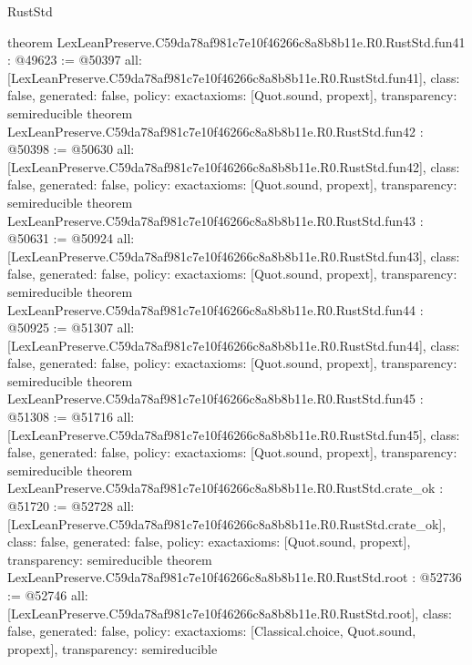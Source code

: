 \begin{lexlean}{RustStd}
\begin{coremodule}
{}
theorem LexLeanPreserve.C59da78af981c7e10f46266c8a8b8b11e.R0.RustStd.fun41 : @49623 := @50397 {
  all: [LexLeanPreserve.C59da78af981c7e10f46266c8a8b8b11e.R0.RustStd.fun41],
  class: false,
  generated: false,
  policy: exact{axioms: [Quot.sound, propext]},
  transparency: semireducible
}
theorem LexLeanPreserve.C59da78af981c7e10f46266c8a8b8b11e.R0.RustStd.fun42 : @50398 := @50630 {
  all: [LexLeanPreserve.C59da78af981c7e10f46266c8a8b8b11e.R0.RustStd.fun42],
  class: false,
  generated: false,
  policy: exact{axioms: [Quot.sound, propext]},
  transparency: semireducible
}
theorem LexLeanPreserve.C59da78af981c7e10f46266c8a8b8b11e.R0.RustStd.fun43 : @50631 := @50924 {
  all: [LexLeanPreserve.C59da78af981c7e10f46266c8a8b8b11e.R0.RustStd.fun43],
  class: false,
  generated: false,
  policy: exact{axioms: [Quot.sound, propext]},
  transparency: semireducible
}
theorem LexLeanPreserve.C59da78af981c7e10f46266c8a8b8b11e.R0.RustStd.fun44 : @50925 := @51307 {
  all: [LexLeanPreserve.C59da78af981c7e10f46266c8a8b8b11e.R0.RustStd.fun44],
  class: false,
  generated: false,
  policy: exact{axioms: [Quot.sound, propext]},
  transparency: semireducible
}
theorem LexLeanPreserve.C59da78af981c7e10f46266c8a8b8b11e.R0.RustStd.fun45 : @51308 := @51716 {
  all: [LexLeanPreserve.C59da78af981c7e10f46266c8a8b8b11e.R0.RustStd.fun45],
  class: false,
  generated: false,
  policy: exact{axioms: [Quot.sound, propext]},
  transparency: semireducible
}
theorem LexLeanPreserve.C59da78af981c7e10f46266c8a8b8b11e.R0.RustStd.crate_ok : @51720 := @52728 {
  all: [LexLeanPreserve.C59da78af981c7e10f46266c8a8b8b11e.R0.RustStd.crate_ok],
  class: false,
  generated: false,
  policy: exact{axioms: [Quot.sound, propext]},
  transparency: semireducible
}
theorem LexLeanPreserve.C59da78af981c7e10f46266c8a8b8b11e.R0.RustStd.root : @52736 := @52746 {
  all: [LexLeanPreserve.C59da78af981c7e10f46266c8a8b8b11e.R0.RustStd.root],
  class: false,
  generated: false,
  policy: exact{axioms: [Classical.choice, Quot.sound, propext]},
  transparency: semireducible
}


\end{coremodule}
\end{lexlean}
